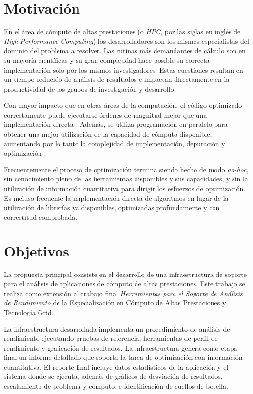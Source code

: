 \documentclass[a4paper]{report}
\begin{document}
\section{Motivación}

En el área de cómputo de altas prestaciones (o {\it HPC}, por las siglas en inglés de {\it High Performance Computing}) los desarrolladores son los mismos
especialistas del dominio del problema a resolver. Las rutinas
más demandantes de cálculo son en su mayoría científicas y su
gran complejidad hace posible su correcta implementación sólo por los mismos investigadores.
Estas cuestiones resultan en un tiempo reducido de análisis de resultados
e impactan directamente en la productividad de los grupos de investigación y
desarrollo.

\bigskip

Con mayor impacto que en otras áreas de la computación, el código
optimizado correctamente puede ejecutarse órdenes de magnitud mejor que una implementación
directa \cite{mm-tool}. Además, se utiliza
programación en paralelo para obtener una mejor utilización de la
capacidad de cómputo disponible; aumentando por lo tanto la complejidad de
implementación, depuración y optimización \cite{is-parallel-programming-hard}.

\bigskip

Frecuentemente el proceso de optimización termina siendo
hecho de modo {\it ad-hoc}, sin conocimiento pleno de las herramientas disponibles y
sus capacidades, y sin la utilización de información cuantitativa para dirigir los
esfuerzos de optimización. Es incluso frecuente la implementación directa
de algoritmos en lugar de la utilización de librerías ya disponibles, optimizadas
profundamente y con correctitud comprobada.

\section{Objetivos}

La propuesta principal consiste en el desarrollo de una infraestructura de soporte para el análisis de aplicaciones de cómputo de altas prestaciones. Este trabajo se realiza como extensión al trabajo final {\it Herramientas para el Soporte de Análisis de Rendimiento} de la Especialización en Cómputo de Altas Prestaciones y Tecnología Grid.

\bigskip

La infraestructura desarrollada implementa un procedimiento de análisis de rendimiento ejecutando pruebas de referencia, herramientas de perfil de rendimiento y graficación de resultados. La infraestructura genera como etapa final un informe detallado que soporta la tarea de optimización con información cuantitativa.
El reporte final incluye datos estadísticos de la aplicación y el sistema donde se ejecuta, además de gráficos de desviación de resultados, escalamiento de problema y cómputo, e identificación de cuellos de botella.
\end{document}
